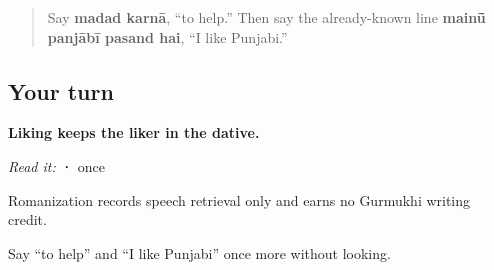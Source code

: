 \label{lesson:PA-R24-help-like-r4}



\begin{quote}
Say \textbf{madad karnā}, “to help.” Then say the already-known line \textbf{mainū̃ panjābī pasand hai}, “I like Punjabi.”
\end{quote}

\subsection*{Your turn}
\textbf{Liking keeps the liker in the dative.}

\emph{Read it:} \textbf{  ·    } once

Romanization records speech retrieval only and earns no Gurmukhi writing credit.

\begin{tcolorbox}[breakable,colback=teal!4,colframe=teal!35!black,title={Before you move on}]
Say “to help” and “I like Punjabi” once more without looking.
\end{tcolorbox}
